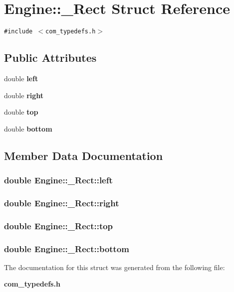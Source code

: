 \section{Engine::\_\-Rect Struct Reference}
\label{structEngine_1_1__Rect}
{\tt \#include $<$com\_\-typedefs.h$>$}

\subsection*{Public Attributes}
\begin{CompactItemize}
\item 
double {\bf left}
\item 
double {\bf right}
\item 
double {\bf top}
\item 
double {\bf bottom}
\end{CompactItemize}


\subsection{Member Data Documentation}
\subsubsection{\setlength{\rightskip}{0pt plus 5cm}double {\bf Engine::\_\-Rect::left}}\label{structEngine_1_1__Rect_93d4a66130cfe412a046e63e6f5d5f35}


\subsubsection{\setlength{\rightskip}{0pt plus 5cm}double {\bf Engine::\_\-Rect::right}}\label{structEngine_1_1__Rect_ee88dc38290991ac5841339ec296b379}


\subsubsection{\setlength{\rightskip}{0pt plus 5cm}double {\bf Engine::\_\-Rect::top}}\label{structEngine_1_1__Rect_81d0394535a2edbebed563fae8462968}


\subsubsection{\setlength{\rightskip}{0pt plus 5cm}double {\bf Engine::\_\-Rect::bottom}}\label{structEngine_1_1__Rect_d0c5ab5bd0316dad829dd72c1c361900}




The documentation for this struct was generated from the following file:\begin{CompactItemize}
\item 
{\bf com\_\-typedefs.h}\end{CompactItemize}
